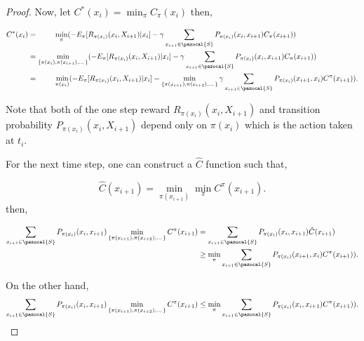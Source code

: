 \documentclass[12pt,aas_macros]{article}
\theoremstyle{definition}
\begin{document}
\begin{proof}
Now, let $C^*(x_{i}) = \min_{\pi} C_{\pi}(x_{{i}})$ then,

\begin{equation}\label{equ_proof1}
\begin{aligned}
C^{*}(x_{{i}}) &=  ~~~~~~~ \min_{\pi}(- E_{\pi}[R_{\pi(x_i)}(x_{i}, X_{{i+1}}) | x_{i}] - \gamma \sum_{x_{i+1} \in \pazocal{S}} P_{\pi(x_{i})}(x_{i},x_{i+1}) C_{\pi}({x_{{i+1}}}))\\
& =  \min_{\{\pi(x_{i}), \pi(x_{{i+1}}),\dots \}}(- E_{\pi}[R_{\pi(x_i)}(x_{i}, X_{{i+1}}) | x_{i}] - \gamma \sum_{x_{i+1} \in \pazocal{S}} P_{\pi(x_{i})}(x_{i},x_{i+1}) C_{\pi}({x_{{i+1}}}))\\
& = ~~~~~~~ \min_{\pi(x_{i})} (- E_{\pi}[R_{\pi(x_i)}(x_{i}, X_{{i+1}}) | x_{i}] - \min_{\{\pi(x_{i+1}), \pi(x_{{i+2}}),\dots \}} \gamma \sum_{x_{i+1} \in \pazocal{S}} P_{\pi(x_{i})}(x_{i+1},x_{i}) C^{\pi}({x_{{i+1}}})).\\
\end{aligned}
\end{equation}

Note that both of the one step reward $R_{\pi(x_i)}(x_{i}, X_{{i+1}})$ and transition probability $P_{\pi(x_{i})}(x_{i}, X_{{i+1}})$ depend only on $\pi(x_{i})$ which is the action taken at $t_i$. 

For the next time step, one can construct a $\hat {C}$ function such that, 

\begin{equation*}
\hat C(x_{{i+1}}) = \min_{\pi(x_{{i+1}})} \min_{\pi} C^{\pi} ({x_{i+1}}).
\end{equation*}
then, 

\begin{equation*}
\begin{aligned}
\sum_{x_{i+1} \in \pazocal{S}} P_{\pi(x_{i})}(x_{i},x_{i+1}) \min_{\{\pi(x_{i+1}), \pi(x_{{i+2}}),\dots \}} C^{\pi}({x_{{i+1}}})&= \sum_{x_{i+1} \in \pazocal{S}} P_{\pi(x_{i})}(x_{i},x_{i+1})  \hat C ({x_{{i+1}}} )\\
& \geq \min_{\pi} \sum_{x_{i+1} \in \pazocal{S}} P_{\pi(x_{i})}(x_{i+1},x_{i}) C^{\pi}({x_{{i+1}}})).
\end{aligned}
\end{equation*}

On the other hand, 
\begin{equation*}
\sum_{x_{i+1} \in \pazocal{S}} P_{\pi(x_{i})}(x_{i},x_{i+1}) \min_{\{\pi(x_{i+1}), \pi(x_{{i+2}}),\dots \}} C^{\pi}({x_{{i+1}}}) \leq \min_{\pi} \sum_{x_{i+1} \in \pazocal{S}} P_{\pi(x_{i})}(x_{i},x_{i+1}) C^{\pi}({x_{{i+1}}})).
\end{equation*}


\end{proof}
\end{document}
